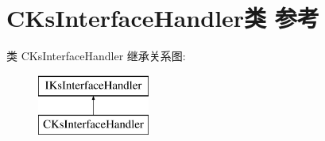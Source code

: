\hypertarget{class_c_ks_interface_handler}{}\section{C\+Ks\+Interface\+Handler类 参考}
\label{class_c_ks_interface_handler}
类 C\+Ks\+Interface\+Handler 继承关系图\+:\begin{figure}[H]
\begin{center}
\leavevmode
\includegraphics[height=2.000000cm]{class_c_ks_interface_handler}
\end{center}
\end{figure}
